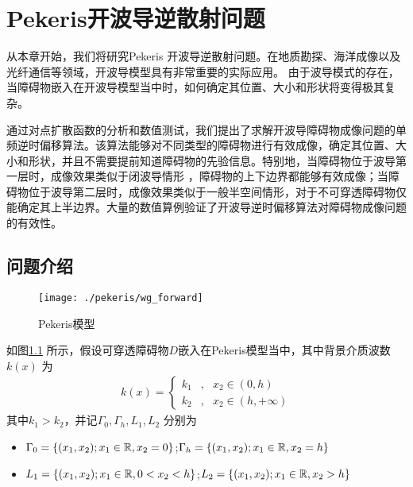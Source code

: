

\chapter{Pekeris开波导逆散射问题}

从本章开始，我们将研究Pekeris 开波导逆散射问题。在地质勘探、海洋成像以及光纤通信等领域，开波导模型具有非常重要的实际应用。
由于波导模式的存在，当障碍物嵌入在开波导模型当中时，如何确定其位置、大小和形状将变得极其复杂。

通过对点扩散函数的分析和数值测试，我们提出了求解开波导障碍物成像问题的单频逆时偏移算法。该算法能够对不同类型的障碍物进行有效成像，确定其位置、大小和形状，并且不需要提前知道障碍物的先验信息。特别地，当障碍物位于波导第一层时，成像效果类似于闭波导情形
\cite{ch_cw}，障碍物的上下边界都能够有效成像；当障碍物位于波导第二层时，成像效果类似于一般半空间情形\cite{ch_ha}，对于不可穿透障碍物仅能确定其上半边界。大量的数值算例验证了开波导逆时偏移算法对障碍物成像问题的有效性。

\section{问题介绍}
\begin{figure}[b]
  \centering
  \caption{Pekeris模型}
  \texttt{[image: ./pekeris/wg\_forward]}
\label{pekeris_model}
\end{figure}
如图\ref{pekeris_model} 所示，假设可穿透障碍物$D$嵌入在Pekeris模型当中，其中背景介质波数$k(x)$ 为
\begin{eqnarray}
k(x)=\left\{
\begin{array}{lll}
  k_1&,&x_2\in(0,h)\\
  k_2&,&x_2\in(h,+\infty)
\end{array}
\right.
\end{eqnarray}
其中$k_1>k_2$，并记$\Gamma_0,\Gamma_h,L_1,L_2$ 分别为

\begin{itemize}
  \item $ \Gamma_0=\{(x_1,x_2);x_1\in \mathbb{R}, x_2=0\}$;\quad\quad$ \Gamma_h=\{(x_1,x_2);x_1\in \mathbb{R}, x_2=h\}$
  \item $ L_1=\{(x_1,x_2);x_1\in \mathbb{R}, 0<x_2<h\}$;\quad\quad$ L_2=\{(x_1,x_2);x_1\in \mathbb{R}, x_2>h\}$
\end{itemize}


